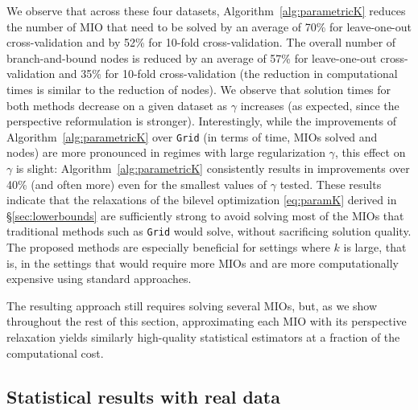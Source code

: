 \documentclass[ijoc,noblindrev]{informs3} %
\begin{document}
We observe that across these four datasets, Algorithm~\ref{alg:parametricK} reduces the number of MIO that need to be solved by an average of 70\% for leave-one-out cross-validation and by 52\% for 10-fold cross-validation. The overall number of branch-and-bound nodes is reduced by an average of 57\% for leave-one-out cross-validation and 35\% for 10-fold cross-validation (the reduction in computational times is similar to the reduction of nodes). 
We observe that solution times for both methods decrease on a given dataset as $\gamma$ increases (as expected, since the perspective reformulation is stronger). Interestingly, while the improvements of Algorithm~\ref{alg:parametricK} over \texttt{Grid} (in terms of time, MIOs solved and nodes) are more pronounced in regimes with large regularization $\gamma$, this effect on $\gamma$ is slight: Algorithm~\ref{alg:parametricK} consistently results in improvements over 40\% (and often more) even for the smallest values of $\gamma$ tested. These results indicate that the relaxations of the bilevel optimization \eqref{eq:paramK} derived in \S\ref{sec:lowerbounds} are sufficiently strong to avoid solving most of the MIOs that traditional methods such as \texttt{Grid} would solve, without sacrificing solution quality. The proposed methods are especially beneficial for settings where $k$ is large, that is, in the settings that would require more MIOs and are more computationally expensive using standard approaches. 

The resulting approach still requires solving several MIOs, but, as we show throughout the rest of this section, approximating each MIO with its perspective relaxation yields similarly high-quality statistical estimators at a fraction of the computational cost.




\subsection{Statistical results with real data}\label{sec:comp_real}
\end{document}
